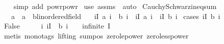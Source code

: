\begin{isabellebody}
\ \ \isamarkupfalse%
\ {\isacharparenleft}{\kern0pt}simp\ add{\isacharcolon}{\kern0pt}\ powr{\isacharunderscore}{\kern0pt}powr{\isacharparenright}{\kern0pt}\isanewline
{}\isamarkupfalse%
\ {\isacharparenleft}{\kern0pt}use\ assms\ \ auto{\isacharparenright}{\kern0pt}%
\endisatagproof
{\isafoldproof}%
%
\isadelimproof
\isanewline
%
\endisadelimproof
\isanewline
{}\isamarkupfalse%
\ Cauchy{\isacharunderscore}{\kern0pt}Schwarz{\isacharunderscore}{\kern0pt}ineq{\isacharunderscore}{\kern0pt}sum{\isacharcolon}{\kern0pt}\isanewline
\ \ \ a\ {\isacharcolon}{\kern0pt}{\isacharcolon}{\kern0pt}\ {\isachardoublequoteopen}{\isacharprime}{\kern0pt}a\ {\isasymRightarrow}\ {\isacharprime}{\kern0pt}b{\isacharcolon}{\kern0pt}{\isacharcolon}{\kern0pt}linordered{\isacharunderscore}{\kern0pt}field{\isachardoublequoteclose}\isanewline
\ \ \ {\isachardoublequoteopen}{\isacharparenleft}{\kern0pt}{\isasymSum}i{\isasymin}I{\isachardot}{\kern0pt}\ a\ i\ {\isacharasterisk}{\kern0pt}\ b\ i{\isacharparenright}{\kern0pt}\ {\isasymle}\ {\isacharparenleft}{\kern0pt}{\isasymSum}i{\isasymin}I{\isachardot}{\kern0pt}\ {\isacharparenleft}{\kern0pt}a\ i{\isacharparenright}{\kern0pt}\ {\isacharasterisk}{\kern0pt}\ {\isacharparenleft}{\kern0pt}{\isasymSum}i{\isasymin}I{\isachardot}{\kern0pt}\ {\isacharparenleft}{\kern0pt}b\ i{\isacharparenright}{\kern0pt}\isanewline
%
\isadelimproof
%
\endisadelimproof
%
\isatagproof
{}\isamarkupfalse%
\ {\isacharparenleft}{\kern0pt}cases\ {\isachardoublequoteopen}{\isacharparenleft}{\kern0pt}{\isasymSum}i{\isasymin}I{\isachardot}{\kern0pt}\ {\isacharparenleft}{\kern0pt}b\ i{\isacharparenright}{\kern0pt}\ {\isachargreater}{\kern0pt}\ {}{\isachardoublequoteclose}{\isacharparenright}{\kern0pt}\isanewline
\ \ \isamarkupfalse%
\ False\isanewline
\ \ \isamarkupfalse%
\ \isamarkupfalse%
\ {\isachardoublequoteopen}{\isasymAnd}i{\isachardot}{\kern0pt}\ i{\isasymin}I\ {\isasymLongrightarrow}\ b\ i\ {\isacharequal}{\kern0pt}\ {}{\isachardoublequoteclose}\ {\isacharbar}{\kern0pt}\ {\isachardoublequoteopen}infinite\ I{\isachardoublequoteclose}\isanewline
\ \ \ \ \isamarkupfalse%
\ {\isacharparenleft}{\kern0pt}metis\ {\isacharparenleft}{\kern0pt}mono{\isacharunderscore}{\kern0pt}tags{\isacharcomma}{\kern0pt}\ lifting{\isacharparenright}{\kern0pt}\ sum{\isacharunderscore}{\kern0pt}pos{}\ zero{\isacharunderscore}{\kern0pt}le{\isacharunderscore}{\kern0pt}power{}\ zero{\isacharunderscore}{\kern0pt}less{\isacharunderscore}{\kern0pt}power{}{\isacharparenright}{\kern0pt}\isanewline

\end{isabellebody}
